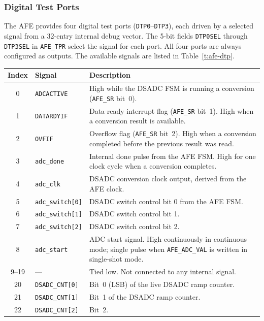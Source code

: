 \subsubsection*{Digital Test Ports}

The AFE provides four digital test ports (\texttt{DTP0}--\texttt{DTP3}), each driven by a selected signal from a 32-entry internal debug vector. The 5-bit fields \texttt{DTP0SEL} through \texttt{DTP3SEL} in \texttt{AFE\_TPR} select the signal for each port. All four ports are always configured as outputs. The available signals are listed in Table~\ref{t:afe-dtp}.

\begin{table}[h]
\centering
\begin{tabularx}{\textwidth}{c l X}
\hline
\textbf{Index} & \textbf{Signal} & \textbf{Description} \\
\hline
0  & \texttt{ADCACTIVE}    & High while the DSADC FSM is running a conversion (\texttt{AFE\_SR} bit~0). \\
1  & \texttt{DATARDYIF}    & Data-ready interrupt flag (\texttt{AFE\_SR} bit~1). High when a conversion result is available. \\
2  & \texttt{OVFIF}        & Overflow flag (\texttt{AFE\_SR} bit~2). High when a conversion completed before the previous result was read. \\
3  & \texttt{adc\_done}    & Internal done pulse from the AFE FSM. High for one clock cycle when a conversion completes. \\
4  & \texttt{adc\_clk}     & DSADC conversion clock output, derived from the AFE clock. \\
5  & \texttt{adc\_switch[0]} & DSADC switch control bit 0 from the AFE FSM. \\
6  & \texttt{adc\_switch[1]} & DSADC switch control bit 1. \\
7  & \texttt{adc\_switch[2]} & DSADC switch control bit 2. \\
8  & \texttt{adc\_start}   & ADC start signal. High continuously in continuous mode; single pulse when \texttt{AFE\_ADC\_VAL} is written in single-shot mode. \\
9--19  & ---               & Tied low. Not connected to any internal signal. \\
20 & \texttt{DSADC\_CNT[0]}  & Bit~0 (LSB) of the live DSADC ramp counter. \\
21 & \texttt{DSADC\_CNT[1]}  & Bit~1 of the DSADC ramp counter. \\
22 & \texttt{DSADC\_CNT[2]}  & Bit~2. \\

\end{tabularx}
\end{table}
